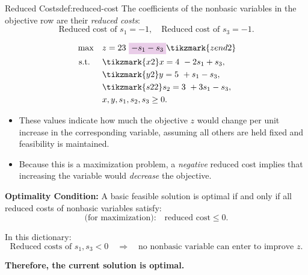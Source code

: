 \begin{remark}{Reduced Costs}{def:reduced-cost}
The coefficients of the nonbasic variables in the objective row are their \emph{reduced costs}:
\[
\text{Reduced cost of } s_1 = -1, \quad \text{Reduced cost of } s_3 = -1.
\]

\[
\begin{aligned}
\max \quad 
& z = 23~ \text{\colorbox{purple!20!white}{$- s_1 - s_3$}} \tikzmark{zend2} \\
\st \quad 
& \tikzmark{x2} x = 4 ~ - 2s_1 + s_3, \\
& \tikzmark{y2} y = 5 ~ + s_1 - s_3, \\
& \tikzmark{s22} s_2 = 3~ + 3s_1 - s_3, \\
& x, y, s_1, s_2, s_3 \ge 0.
\end{aligned}
\]


\bigskip

\begin{itemize}
    \item These values indicate how much the objective \( z \) would change per unit increase in the corresponding variable, assuming all others are held fixed and feasibility is maintained.
    \item Because this is a maximization problem, a \emph{negative} reduced cost implies that increasing the variable would \emph{decrease} the objective.
\end{itemize}

\medskip

\noindent\textbf{Optimality Condition:}  
A basic feasible solution is optimal if and only if all reduced costs of nonbasic variables satisfy:
\[
\text{(for maximization):} \quad \text{reduced cost} \le 0.
\]

\medskip

In this dictionary:
\[
\text{Reduced costs of } s_1, s_3 < 0 \quad \Rightarrow \quad \text{no nonbasic variable can enter to improve } z.
\]

\textbf{Therefore, the current solution is optimal.}
\end{remark}

